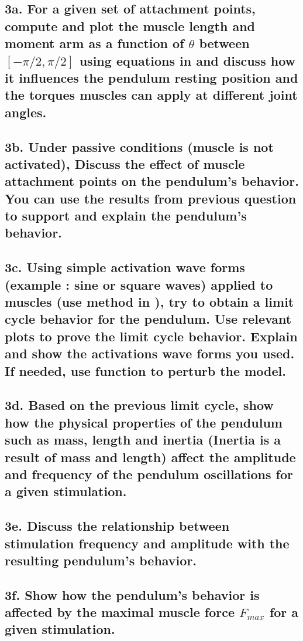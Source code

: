 \documentclass{cmc}
\begin{document}
\subsection*{3a. For a given set of attachment points, compute and
  plot the muscle length and moment arm as a function of $\theta$
  between $[-\pi/2, \pi/2]$ using equations in 
  and discuss how it influences the pendulum resting position and the
  torques muscles can apply at different joint angles.}
\label{sec:3a}


\subsection*{3b. Under passive conditions (muscle is not activated),
  Discuss the effect of muscle attachment points on the pendulum's
  behavior. You can use the results from previous question to support
  and explain the pendulum's behavior.}
\label{sec:3b}


\subsection*{3c. Using simple activation wave forms (example : sine or
  square waves) applied to muscles (use
   method in
  ), try to obtain a limit cycle behavior for
  the pendulum. Use relevant plots to prove the limit cycle behavior.
  Explain and show the activations wave forms you used. If needed, use
   function to
  perturb the model.}
\label{sec:3c}

\subsection*{3d. Based on the previous limit cycle, show how the
  physical properties of the pendulum such as mass, length and inertia
  (Inertia is a result of mass and length) affect the amplitude and
  frequency of the pendulum oscillations for a given stimulation.}
\label{sec:3d}

\subsection*{3e. Discuss the relationship between stimulation
  frequency and amplitude with the resulting pendulum's behavior.}
\label{sec:3e}

\subsection*{3f. Show how the pendulum's behavior is affected by the
  maximal muscle force $F_{max}$ for a given stimulation.}
\label{sec:3f}
\end{document}
